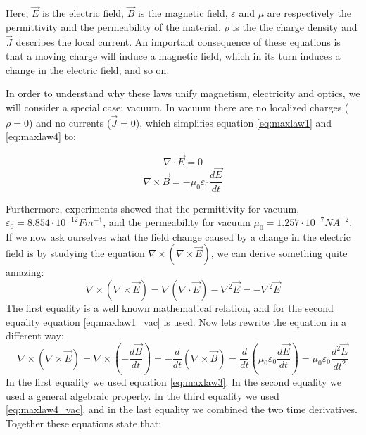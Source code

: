 Here, $\vec{E}$ is the electric field, $\vec{B}$ is the magnetic field, $\varepsilon$ and $\mu$ are respectively the permittivity and the permeability of the material. $\rho$ is the the charge density and $\vec{J}$ describes the local current. %
An important consequence of these equations is that a moving charge will induce a magnetic field, which in its turn induces a change in the electric field, and so on.

In order to understand why these laws unify magnetism, electricity and optics, we will consider a special case: vacuum. In vacuum there are no localized charges ($\rho = 0$) and no currents ($\vec{J}=0$), which simplifies equation \ref{eq:maxlaw1} and \ref{eq:maxlaw4} to: 

\begin{equation} \nabla \cdot   \vec{E} = 0 \label{eq:maxlaw1_vac}\end{equation}
\begin{equation} \nabla \times \vec{B} = -\mu_0\varepsilon_0\frac{d\vec{E}}{dt}\label{eq:maxlaw4_vac}\end{equation}

Furthermore, experiments showed that the permittivity for vacuum, $\varepsilon_0 = 8.854\cdot10^{-12} Fm^{-1}$, and the permeability for vacuum $\mu_0 = 1.257 \cdot 10^{-7} N A^{-2}$. If we now ask ourselves what the field change caused by a change in the electric field is by studying the equation $\nabla \times( \nabla \times \vec{E}) $, we can derive something quite amazing:  
\[ \nabla \times( \nabla \times \vec{E}) = \nabla (\nabla \cdot
\vec{E}) -\nabla^2 \vec{E} =-\nabla^2 \vec{E} \]
The first equality is a well known mathematical relation, and for the second equality equation \ref{eq:maxlaw1_vac} is used. 
Now lets rewrite the equation in a different way:
\[\nabla \times( \nabla \times \vec{E})=
\nabla\times(-\frac{d\vec{B}}{dt}) =
-\frac{d}{dt}(\nabla\times\vec{B})=\frac{d}{dt}(\mu_0\varepsilon_0\frac{d\vec{E}}{dt})
= \mu_0\varepsilon_0\frac{d^2\vec{E}}{dt^2}\]
In the first equality we used equation \ref{eq:maxlaw3}. In the second equality we used a general algebraic property. In the third equality we used \ref{eq:maxlaw4_vac}, and in the last equality we combined the two time derivatives. Together these equations state that:

